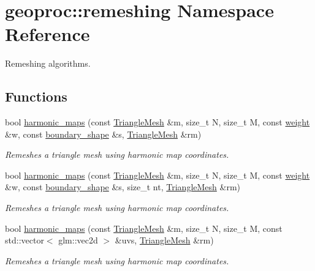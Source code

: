 \hypertarget{namespacegeoproc_1_1remeshing}{}\section{geoproc\+:\+:remeshing Namespace Reference}
\label{namespacegeoproc_1_1remeshing}


Remeshing algorithms.  


\subsection*{Functions}
\begin{DoxyCompactItemize}
\item 
bool \hyperlink{namespacegeoproc_1_1remeshing_a5ed68eab2cd304f825321c46cdcdc17e}{harmonic\+\_\+maps} (const \hyperlink{classgeoproc_1_1TriangleMesh}{Triangle\+Mesh} \&m, size\+\_\+t N, size\+\_\+t M, const \hyperlink{namespacegeoproc_a12e5a10581b53b9dd9a509127527f843}{weight} \&w, const \hyperlink{namespacegeoproc_a494da744a805b80f842402f0a806ccfc}{boundary\+\_\+shape} \&s, \hyperlink{classgeoproc_1_1TriangleMesh}{Triangle\+Mesh} \&rm)
\begin{DoxyCompactList}\small\item\em Remeshes a triangle mesh using harmonic map coordinates. \end{DoxyCompactList}\item 
bool \hyperlink{namespacegeoproc_1_1remeshing_a93ecfce9f176fa6e7890df1c0acf656f}{harmonic\+\_\+maps} (const \hyperlink{classgeoproc_1_1TriangleMesh}{Triangle\+Mesh} \&m, size\+\_\+t N, size\+\_\+t M, const \hyperlink{namespacegeoproc_a12e5a10581b53b9dd9a509127527f843}{weight} \&w, const \hyperlink{namespacegeoproc_a494da744a805b80f842402f0a806ccfc}{boundary\+\_\+shape} \&s, size\+\_\+t nt, \hyperlink{classgeoproc_1_1TriangleMesh}{Triangle\+Mesh} \&rm)
\begin{DoxyCompactList}\small\item\em Remeshes a triangle mesh using harmonic map coordinates. \end{DoxyCompactList}\item 
bool \hyperlink{namespacegeoproc_1_1remeshing_af6de9f8e386ce37b161aa7f1f54cc47e}{harmonic\+\_\+maps} (const \hyperlink{classgeoproc_1_1TriangleMesh}{Triangle\+Mesh} \&m, size\+\_\+t N, size\+\_\+t M, const std\+::vector$<$ glm\+::vec2d $>$ \&uvs, \hyperlink{classgeoproc_1_1TriangleMesh}{Triangle\+Mesh} \&rm)
\begin{DoxyCompactList}\small\item\em Remeshes a triangle mesh using harmonic map coordinates. \end{DoxyCompactList}\item 

\end{DoxyCompactItemize}
